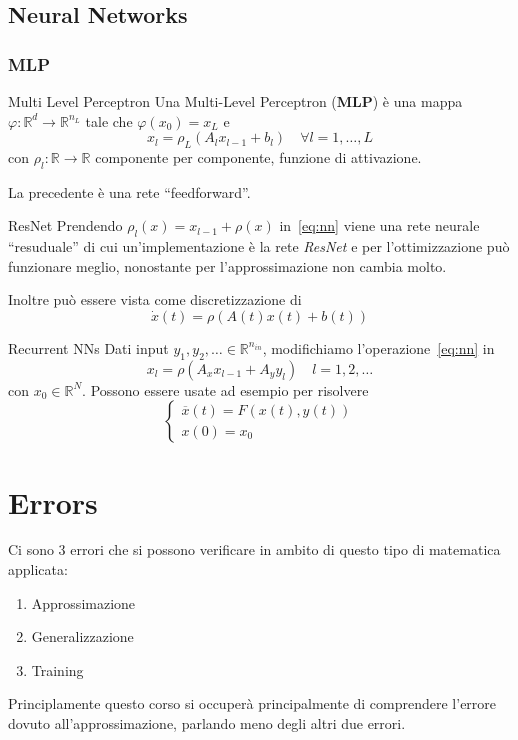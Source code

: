 \section{Neural Networks}
\subsection{MLP}
\begin{definition}{Multi Level Perceptron}
    Una Multi-Level Perceptron (\textbf{MLP}) è una mappa \(\varphi : \mathbb{R}^{d} \to \mathbb{R}^{n_L}\) tale che \(\varphi {(x_{0})} = x_L\) e 
    \begin{equation}
      x_l = \rho_L(A_l x_{l-1} + b_l) \quad \forall l = 1,\dots,L
    \end{equation}\label{eq:nn}
    con \(\rho_l : \mathbb{R} \to \mathbb{R}\) componente per componente, funzione di attivazione.

\end{definition}

La precedente è una rete ``feedforward''.

\begin{definition}{ResNet}
    Prendendo \(\rho_l{(x)} = x_{l-1} + \rho(x)\) in~\eqref{eq:nn} viene una rete neurale ``resuduale'' di cui un'implementazione è la rete \emph{ResNet} e per l'ottimizzazione può funzionare meglio, nonostante per l'approssimazione non cambia molto.

    Inoltre può essere vista come discretizzazione di 
    \[
      \dot{x}{(t)} = \rho (A{(t)}x{(t)} + b{(t)})
    \]
\end{definition}

\begin{definition}{Recurrent NNs}
Dati input \(y_{1}, y_{2}, \dots \in \mathbb{R}^{n_{in} } \), modifichiamo
l'operazione~\eqref{eq:nn} in
\[
  x_l = \rho(A_x x_{l-1} + A_yy_l ) \quad l = 1,2,\dots
\]
con \(x_{0}\in \mathbb{R}^{N}\). Possono essere usate ad esempio per risolvere
\[
  \begin{cases}{}
      \overline{x}{(t)} = F{(x{(t)}, y{(t)})} \\
      x{(0)} = x_{0}
  \end{cases}
\]
\end{definition}

\chapter{Errors}
Ci sono 3 errori che si possono verificare in ambito di questo tipo di
matematica applicata:
\begin{enumerate}[label = \arabic*.]
    \item Approssimazione
    \item Generalizzazione
    \item Training
\end{enumerate}
Principlamente questo corso si occuperà principalmente di comprendere l'errore
dovuto all'approssimazione, parlando meno degli altri due errori.

